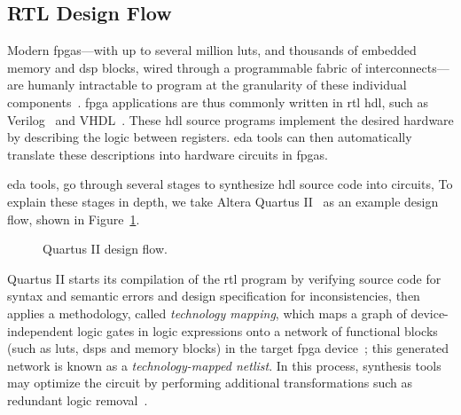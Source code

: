 \subsection{RTL Design Flow}
\label{bg:sub:rtl_design}

Modern \glspl{fpga}---with up to several million \glspl{lut}, and thousands
of embedded memory and \gls{dsp} blocks, wired through a programmable fabric
of interconnects---are humanly intractable to program at the granularity of
these individual components~\cite{kapre08}.  \Gls{fpga} applications are
thus commonly written in \gls{rtl} \gls{hdl}, such as Verilog~\cite{verilog}
and VHDL~\cite{vhdl}.  These \gls{hdl} source programs implement the desired
hardware by describing the logic between registers.  \Gls{eda} tools can
then automatically translate these descriptions into hardware circuits in
\glspl{fpga}.

\Gls{eda} tools, go through several stages to synthesize \gls{hdl} source
code into circuits, To explain these stages in depth, we take Altera Quartus
II~\cite{quartus} as an example design flow, shown in Figure~\ref{fig:quartus}.
\begin{figure}[ht]
    \centering
    \singlespacing%
    \caption{Quartus II design flow.}\label{fig:quartus}
\end{figure}

Quartus II starts its compilation of the \gls{rtl} program by verifying
source code for syntax and semantic errors and design specification for
inconsistencies, then applies a methodology, called \emph{technology mapping},
which maps a graph of device-independent logic gates in logic expressions onto
a network of functional blocks (such as \glspl{lut}, \glspl{dsp} and memory
blocks) in the target \gls{fpga} device~\cite{cong08}; this generated network
is known as a \emph{technology-mapped netlist}.  In this process, synthesis
tools may optimize the circuit by performing additional transformations such as
redundant logic removal~\cite{quartus}.

